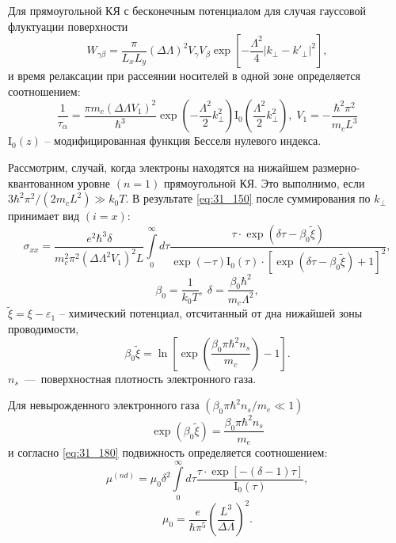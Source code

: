 Для прямоугольной КЯ с бесконечным потенциалом для случая гауссовой флуктуации поверхности
\begin{equation} \label{eq:31_160}
W_{\gamma \beta } =\frac{\pi }{L_x L_y } (\Delta \Lambda )^2 V_{\gamma } V_{\beta } \exp \left[-\frac{\Lambda^2 }{4} \left|k_{\bot } -k'_{\bot } \right|^2 \right],
\end{equation}
и время релаксации при рассеянии носителей в одной зоне определяется соотношением:
\begin{equation} \label{eq:31_170}
\frac{1}{\tau _{\alpha } } =\frac{\pi m_c (\Delta \Lambda V_1 )^2 }{\hbar^3 } \exp \left(-\frac{\Lambda^2}{2} k_{\bot }^2 \right)\mathrm{I}_0 \left(\frac{\Lambda^2 }{2} k_{\bot }^2 \right), \;
V_{1} =-\frac{\hbar^2 \pi^2 }{m_c L^3 }
\end{equation}
${\mathrm I}_0 (z)$ -- модифицированная функция Бесселя нулевого индекса.

Рассмотрим, случай, когда электроны находятся на нижайшем размерно-квантованном уровне $(n=1)$ прямоугольной КЯ. Это выполнимо, если $3\hbar ^{2} \pi ^{2} /\left(2m_c L^2 \right) \gg k_0 T$. В результате \eqref{eq:31_150} после суммирования по $k_{\bot } $ принимает вид $(i=x)$:
\begin{equation} \label{eq:31_180}
\sigma _{xx} =\frac{e^2 \hbar^3 \delta}{m_c^2 \pi^2 \left(\Delta \Lambda^2 V_1 \right)^2 L} \int\limits_0^\infty {d\tau \frac{\tau \cdot \exp \left(\delta \tau -\beta_0 \tilde{\xi }\right)}{\exp(-\tau )\mathrm{I}_0 (\tau )\cdot \left[\exp \left(\delta \tau -\beta_0 \tilde{\xi }\right)+1\right]^2 }},
\end{equation}
\[
\beta_0 = \frac{1}{k_0 T}, \; \delta =\frac{\beta_0 \hbar^2 }{m_c \Lambda ^{2} },
\] 
$\tilde{\xi }=\xi -\varepsilon _{1} $ -- химический потенциал, отсчитанный от дна нижайшей зоны проводимости,
\begin{equation} \label{eq:31_190}
\beta _{0} \tilde{\xi }=\ln\left[\exp\left(\frac{\beta_0 \pi \hbar^2 n_s }{m_c} \right)-1\right].
\end{equation}
$n_s $~---~поверхностная плотность электронного газа.

Для невырожденного электронного газа $(\beta_0 \pi \hbar^2 n_s /m_e \ll 1)$
$$\exp(\beta_0 \tilde{\xi }) = \frac{\beta_0 \pi \hbar^2 n_s}{m_e} $$
и согласно \eqref{eq:31_180} подвижность определяется соотношением:
\begin{equation} \label{eq:31_200}
\mu ^{(nd)} =\mu _{0} \delta ^{2} \int\limits_0^\infty {d\tau \frac{\tau \cdot \exp \left[-\left(\delta -1\right)\tau \right]}{\mathrm{I}_{0} (\tau )}},
\end{equation}
\[
\mu _{0} =\frac{e}{\hbar \pi ^{5} } \left(\frac{L^{3} }{\Delta \Lambda } \right)^2.
\] 

